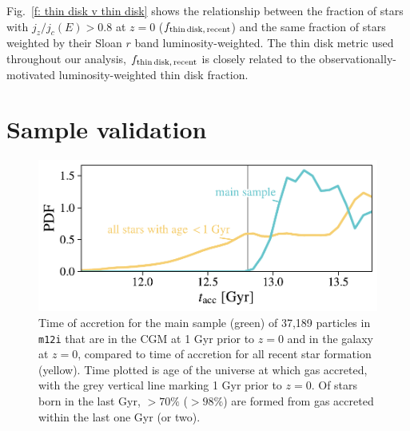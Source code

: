 \documentclass[fleqn,usenatbib]{mnras}
\newcommand{\fthin}{f_{\rm thin\,disk,\,recent}}
\begin{document}
Fig.~\ref{f: thin disk v thin disk} shows the relationship between the fraction of stars with $j_z/j_c(E)>0.8$ at $z=0$ ($\fthin$) and the same fraction of stars weighted by their Sloan $r$ band luminosity-weighted.
The thin disk metric used throughout our analysis, $\fthin$ is closely related to the observationally-motivated luminosity-weighted thin disk fraction.

\section{Sample validation}
\label{s: appendix-sample validation}

\begin{figure}
    \centering
    \includegraphics[width=\columnwidth]{figures/selected_to_all_comparison/tacc_m12i_md.pdf}
    \caption{
    Time of accretion for the main sample (green) of 37,189 particles in \texttt{m12i} that are in the CGM at 1 Gyr prior to $z=0$ and in the galaxy at $z=0$, compared to time of accretion for all recent star formation (yellow).
    Time plotted is age of the universe at which gas accreted, with the grey vertical line marking 1 Gyr prior to $z=0$.
    Of stars born in the last Gyr, $> 70\%$ ($> 98\%$) are formed from gas accreted within the last one Gyr (or two).
    }
    \label{f: sample validation -- tacc}
\end{figure}
\end{document}
